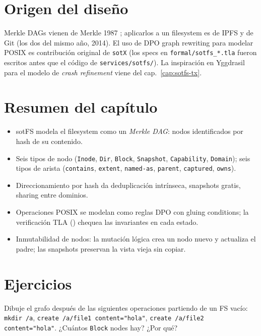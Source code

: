 \section{Origen del diseño}

Merkle DAGs vienen de Merkle 1987 \cite{Merkle1987-DAG}; aplicarlos
a un filesystem es de IPFS y de Git (los dos del mismo año, 2014).
El uso de DPO graph rewriting para modelar POSIX es contribución
original de \texttt{sotX} (los specs en \texttt{formal/sotfs\_*.tla}
fueron escritos antes que el código de
\texttt{services/sotfs/}). La inspiración en Yggdrasil
\cite{Sigurbjarnarson2016-Yggdrasil} para el modelo de \emph{crash
refinement} viene del cap.~\ref{cap:sotfs-tx}.

\section*{Resumen del capítulo}

\begin{itemize}
  \item sotFS modela el filesystem como un \emph{Merkle DAG}:
    nodos identificados por hash de su contenido.
  \item Seis tipos de nodo (\texttt{Inode}, \texttt{Dir},
    \texttt{Block}, \texttt{Snapshot}, \texttt{Capability},
    \texttt{Domain}); seis tipos de arista (\texttt{contains},
    \texttt{extent}, \texttt{named-as}, \texttt{parent},
    \texttt{captured}, \texttt{owns}).
  \item Direccionamiento por hash da deduplicación
    intrínseca, snapshots gratis, sharing entre dominios.
  \item Operaciones POSIX se modelan como reglas DPO con gluing
    conditions; la verificación TLA ()
    chequea las invariantes en cada estado.
  \item Inmutabilidad de nodos: la mutación lógica crea un nodo
    nuevo y actualiza el padre; las snapshots preservan la
    vista vieja sin copiar.
\end{itemize}

\section*{Ejercicios}

\begin{ejercicio}[$\star$]
Dibuje el grafo después de las siguientes operaciones partiendo
de un FS vacío: \texttt{mkdir /a}, \texttt{create /a/file1
content="hola"}, \texttt{create /a/file2 content="hola"}. ¿Cuántos
\texttt{Block} nodes hay? ¿Por qué?
\end{ejercicio}

